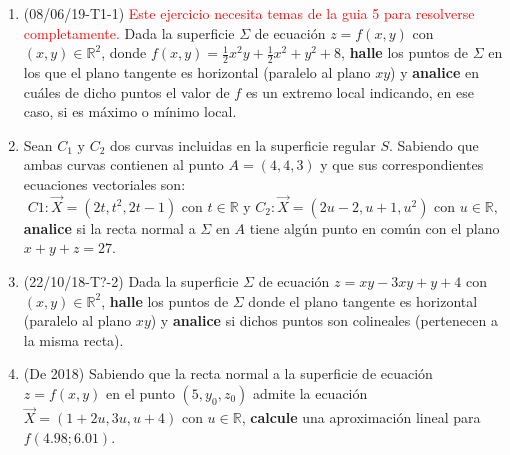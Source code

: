 \documentclass[12pt,a4paper]{article}
\renewcommand{\b}[1]{\textbf{#1}}
\newcommand{\red}[1]{\textcolor{red}{#1}}
\newcommand{\R}{\mathbb{R}}
\newcommand{\y}{\text{ y }}
\begin{document}
\begin{enumerate}
	\item (08/06/19-T1-1) \red{Este ejercicio necesita temas de la guia 5 para resolverse completamente.} Dada la superficie $ \Sigma $ de ecuación $ z = f ( x, y ) $ con $ ( x, y ) \in\R^2$, donde $ f ( x, y ) = \frac{1}{2} x^2 y + \frac{1}{2} x^2 + y^2 + 8 $, \b{halle} los puntos de $ \Sigma $ en los que el plano tangente es horizontal (paralelo al plano $ xy $) y \b{analice} en	cuáles de dicho puntos el valor de $ f $ es un extremo local indicando, en ese caso, si es máximo o mínimo local.
	
	\item Sean $ C_1 \y C_2 $ dos curvas incluidas en la superficie regular $ S $. Sabiendo que ambas curvas contienen al punto $ A = ( 4, 4, 3 ) $ y que sus correspondientes ecuaciones vectoriales son:
	\[C 1 : \vec{X} = ( 2 t, t^2, 2 t - 1 )\text{ con } t \in\R \y C_2 : \vec{X} = ( 2 u - 2, u + 1, u^2 ) \text{ con } u \in \R,\]
	\b{analice} si la recta normal a $ \Sigma $ en $ A $ tiene algún punto en común con el plano $ x + y + z = 27  $.
	
	\item (22/10/18-T?-2) Dada la superficie $ \Sigma $ de ecuación $ z = x y - 3 x y + y + 4 $ con $ ( x, y )\in\R^2$, \b{halle} los puntos de $ \Sigma $ donde el plano tangente es horizontal (paralelo al plano $ xy  $) y \b{analice} si dichos puntos son colineales (pertenecen a la misma recta).
	
	\item (De 2018) Sabiendo que la recta normal a la superficie de ecuación $ z = f(x, y) $ en el punto $ (5, y_0, z_0 ) $ admite la ecuación $ \vec{X} = (1 + 2 u, 3 u, u + 4) $ con $ u \in\R $, \b{calcule}  una aproximación lineal para $ f(4.98; 6.01) $.
\end{enumerate}
	
\end{document}
